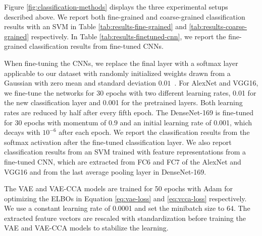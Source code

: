 Figure \ref{fig:classification-methods} displays the three experimental setups described above. We report both fine-grained and coarse-grained classification results with an SVM in Table \ref{tab:results-fine-grained} and \ref{tab:results-coarse-grained} respectively. In Table \ref{tab:results-finetuned-cnn}, we report the fine-grained classification results from fine-tuned CNNs.

When fine-tuning the CNNs,
we replace the final layer with a softmax layer applicable to our dataset with randomly initialized weights drawn from a Gaussian with zero mean and standard deviation $0.01$~. 
For AlexNet and VGG16, we fine-tune the networks for 30 epochs with two different learning rates, 0.01 for the new classification layer and 0.001 for the pretrained layers. Both learning rates are reduced by half after every fifth epoch. The DenseNet-169 is fine-tuned for 30 epochs with momentum of $0.9$ and an initial learning rate of 0.001, which decays with $10^{-6}$ after each epoch. We report the classification results from the softmax activation after the fine-tuned classification layer. 
We also report classification results from an SVM trained with feature representations from a fine-tuned CNN, which are extracted from FC6 and FC7 of the AlexNet and VGG16 and from the last average pooling layer in DenseNet-169.

The VAE and VAE-CCA models are trained for 50 epochs with Adam  for optimizing the ELBOs in Equation \ref{eq:vae-loss} and \ref{eq:vcca-loss} respectively. We use a constant learning rate of 0.0001 and set the minibatch size to 64. The extracted feature vectors are rescaled with standardization before training the VAE and VAE-CCA models to stabilize the learning.


